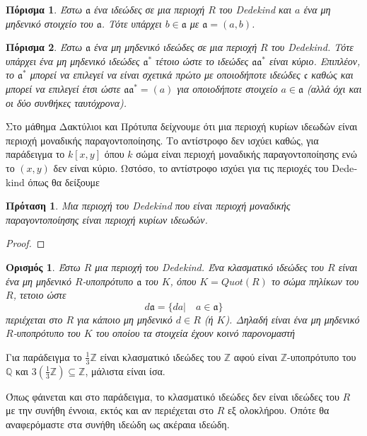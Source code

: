 \documentclass[oneside,a4paper]{article}
\newtheorem*{defn}{Ορισμός}
\newtheorem{prop}{Πρόταση}
\newtheorem{cor}{Πόρισμα}
\newcommand {\tl}{\textlatin}
\newcommand{\Z}{\mathbb{Z}}
\newcommand{\Q}{\mathbb{Q}}
\begin{document}
\begin{cor}
	Έστω $\mathfrak{a}$ ένα ιδεώδες σε μια περιοχή $R$ του \tl{Dedekind} και $a$ ένα μη μηδενικό στοιχείο του $\mathfrak{a}$. Tότε υπάρχει $b \in \mathfrak{a}$ με $\mathfrak{a} = (a,b)$.
\end{cor}

\begin{cor} Έστω $\mathfrak{a}$ ένα μη μηδενικό ιδεώδες σε μια περιοχή $R$ του \tl{Dedekind}. Τότε υπάρχει ένα μη μηδενικό ιδεώδες $\mathfrak{a}^{*}$ τέτοιο ώστε το ιδεώδες $\mathfrak{a}\mathfrak{a}^{*}$ είναι κύριο. Επιπλέον, το $\mathfrak{a}^{*}$ μπορεί να επιλεγεί να είναι σχετικά πρώτο με οποιοδήποτε ιδεώδες $\mathfrak{c}$ καθώς και μπορεί να επιλεγεί έτσι ώστε $\mathfrak{a}\mathfrak{a}^{*} = (a)$ για οποιοδήποτε στοιχείο $a \in \mathfrak{a}$ (αλλά όχι και οι δύο συνθήκες ταυτόχρονα).
\end{cor}

Στο μάθημα Δακτύλιοι και Πρότυπα δείχνουμε ότι μια περιοχή κυρίων ιδεωδών είναι περιοχή μοναδικής παραγοντοποίησης. Το αντίστροφο δεν ισχύει καθώς, για παράδειγμα το $k[x,y]$ όπου $k$ σώμα είναι περιοχή μοναδικής παραγοντοποίησης ενώ το $(x,y)$ δεν είναι κύριο. Ωστόσο, το αντίστροφο ισχύει για τις περιοχές του \tl{Dedekind} όπως θα δείξουμε

\begin{prop}
	Μια περιοχή του \tl{Dedekind} που είναι περιοχή μοναδικής παραγοντοποίησης είναι περιοχή κυρίων ιδεωδών.
\end{prop}


\begin{proof}
\end{proof}


\begin{defn}
	Έστω $R$ μια περιοχή του \tl{Dedekind}. Ένα κλασματικό ιδεώδες του $R$ είναι ένα μη μηδενικό $R$-υποπρότυπο $\mathfrak{a}$ του $K$, όπου $K = Quot(R)$ το σώμα πηλίκων του $R$, τετοιο ώστε 
	$$d \mathfrak{a} = \{da| \quad a \in \mathfrak{a}\}$$
	περιέχεται στο $R$ για κάποιο μη μηδενικό $d \in R$ (ή $K$). Δηλαδή είναι ένα μη μηδενικό $R$-υποπρότυπο του $K$ του οποίου τα στοιχεία έχουν κοινό παρονομαστή  
\end{defn}

Για παράδειγμα το $\frac{1}{3} \mathbb{Z}$ είναι κλασματικό ιδεώδες του $\Z$ αφού είναι $\Z$-υποπρότυπο του $\Q$ και $3 (\frac{1}{3}\Z) \subseteq \Z$, μάλιστα είναι ίσα.

Όπως φάινεται και στο παράδειγμα, το κλασματικό ιδεώδες δεν είναι ιδεώδες του $R$ με την συνήθη έννοια, εκτός και αν περιέχεται στο $R$ εξ ολοκλήρου. Οπότε θα αναφερόμαστε στα συνήθη ιδεώδη ως ακέραια ιδεώδη.
\end{document}
